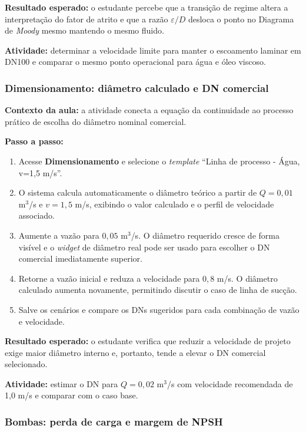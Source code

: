 \textbf{Resultado esperado:} o estudante percebe que a transição de regime altera a interpretação do fator de atrito e que a razão $\varepsilon/D$ desloca o ponto no Diagrama de \textit{Moody} mesmo mantendo o mesmo fluido.

\textbf{Atividade:} determinar a velocidade limite para manter o escoamento laminar em DN100 e comparar o mesmo ponto operacional para água e óleo viscoso.

\subsubsection{Dimensionamento: diâmetro calculado e DN comercial}

\textbf{Contexto da aula:} a atividade conecta a equação da continuidade ao processo prático de escolha do diâmetro nominal comercial.

\textbf{Passo a passo:}
\begin{enumerate}
    \item Acesse \textbf{Dimensionamento} e selecione o \textit{template} ``Linha de processo - Água, v=1,5 m/s''.
    \item O sistema calcula automaticamente o diâmetro teórico a partir de $Q = 0{,}01$ m$^3$/s e $v = 1{,}5$ m/s, exibindo o valor calculado e o perfil de velocidade associado.
    \item Aumente a vazão para $0{,}05$ m$^3$/s. O diâmetro requerido cresce de forma visível e o \textit{widget} de diâmetro real pode ser usado para escolher o DN comercial imediatamente superior.
    \item Retorne a vazão inicial e reduza a velocidade para $0{,}8$ m/s. O diâmetro calculado aumenta novamente, permitindo discutir o caso de linha de sucção.
    \item Salve os cenários e compare os DNs sugeridos para cada combinação de vazão e velocidade.
\end{enumerate}

\textbf{Resultado esperado:} o estudante verifica que reduzir a velocidade de projeto exige maior diâmetro interno e, portanto, tende a elevar o DN comercial selecionado.

\textbf{Atividade:} estimar o DN para $Q = 0{,}02$ m$^3$/s com velocidade recomendada de 1,0 m/s e comparar com o caso base.

\subsubsection{Bombas: perda de carga e margem de NPSH}

